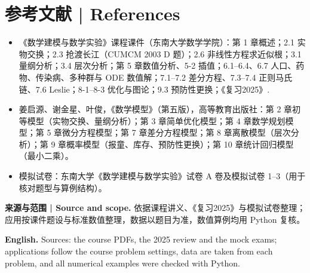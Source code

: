 \documentclass[UTF8,11pt,a4paper]{ctexart}
\newcommand{\EN}[1]{\par\noindent\textbf{English.} #1\par}
\begin{document}
\section*{参考文献 | References}
\par\medskip\begingroup\small
\begin{itemize}[leftmargin=1.2em,itemsep=1pt,topsep=2pt]
\item 《数学建模与数学实验》课程课件（东南大学数学学院）：第 1 章概述；2.1 实物交换；2.3 抢渡长江（CUMCM 2003 D 题）；2.6 非线性方程求近似根；3.1 量纲分析；3.4 层次分析；第 5 章数值分析、5-2 插值；6.1--6.4、6.7 人口、药物、传染病、多种群与 ODE 数值解；7.1--7.2 差分方程、7.3--7.4 正则马氏链、7.6 Leslie；8-1--8-3 优化与图论；9.3 预防性更换；《复习2025》.
\item 姜启源、谢金星、叶俊，《数学模型》（第五版），高等教育出版社：第 2 章初等模型（实物交换、量纲分析）；第 3 章简单优化模型；第 4 章数学规划模型；第 5 章微分方程模型；第 7 章差分方程模型；第 8 章离散模型（层次分析）；第 9 章概率模型（报童、库存、预防性更换）；第 10 章统计回归模型（最小二乘）。
\item 模拟试卷：东南大学《数学建模与数学实验》试卷 A 卷及模拟试卷 1--3（用于核对题型与算例结构）。
\end{itemize}
\noindent\textbf{来源与范围 | Source and scope.} 依据课程讲义、《复习2025》与模拟试卷整理；应用按课件题设与标准数值整理，数据以题目为准，数值算例均用 Python 复核。
\EN{Sources: the course PDFs, the 2025 review and the mock exams; applications follow the course problem settings, data are taken from each problem, and all numerical examples were checked with Python.}
\par\endgroup
\end{document}
